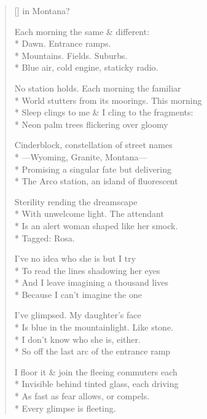 \label{ch:can_you_imagine}
\settowidth{\versewidth}{Sleep clings to me \& I cling to the fragments:}
\begin{verse}[\versewidth]
                     in Montana?

Each morning the same \& different:\\*
Dawn. Entrance ramps.\\*
Mountains. Fields. Suburbs.\\*
Blue air, cold engine, staticky radio.

No station holds. Each morning the familiar\\*
World stutters from its moorings.  This morning\\*
Sleep clings to me \& I cling to the fragments:\\*
Neon palm trees flickering over gloomy

Cinderblock, constellation of street names\\*
---Wyoming, Granite, Montana---\\*
Promising a singular fate but delivering\\*
The Arco station, an island of fluorescent 

Sterility rending the dreamscape\\*
With unwelcome light.  The attendant\\*
Is an alert woman shaped like her smock.\\*
Tagged: Rosa.

I've no idea who she is but I try\\*
To read the lines shadowing her eyes\\*
And I leave imagining a thousand lives\\*
Because I can't imagine the one

I've glimpsed.  My daughter's face\\*
Is blue in the mountainlight.  Like stone.\\*
I don't know who she is, either.\\*
So off the last arc of the entrance ramp

I floor it \& join the fleeing commuters each\\*
Invisible behind tinted glass, each driving\\*
As fast as fear allows, or compels.\\*
Every glimpse is fleeting.
\end{verse}
